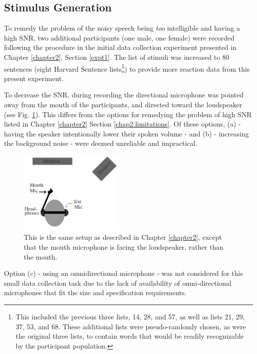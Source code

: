 \subsection{Stimulus Generation}
\label{chap3:methods:stimuli}

To remedy the problem of the noisy speech being \textit{too} intelligible and having a high SNR, 
two additional participants (one male, one female) were recorded following the procedure in the initial data collection experiment presented in Chapter \ref{chapter2}, Section \ref{expt1}.  The list of stimuli was increased to 80 sentences (eight Harvard Sentence lists\footnote{This included the previous three lists, 14, 28, and 57, as well as lists 21, 29, 37, 53, and 68. These additional lists were pseudo-randomly chosen, as were the original three lists, to contain words that would be readily recognizable by the participant population.}) to provide more reaction data from this present experiment.  

To decrease the SNR, during recording the directional microphone was pointed away from the mouth of the participants, and directed toward the loudspeaker (see Fig. \ref{fig:overallSetUp_new}).  This differs from the options for remedying the problem of high SNR listed in Chapter \ref{chapter2} Section \ref{chap2:limitations}.  Of these options, (a) - having the speaker intentionally lower their spoken volume - and (b) - increasing the background noise - were deemed unreliable and impractical.  
%
\begin{figure}
\centering
  \includegraphics[width=0.45\textwidth]{figure/overallSetUp_new.png}
  \caption{This is the same setup as described in Chapter \ref{chapter2}, except that the mouth microphone is facing the loudspeaker, rather than the mouth.}
  \label{fig:overallSetUp_new}
\end{figure}
%
Option (c) - using an omnidirectional microphone - was not considered for this small data collection task due to the lack of availability of omni-directional microphones that fit the size and specification requirements.

